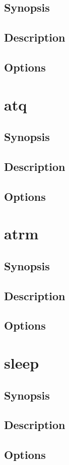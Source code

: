 \documentclass[a4paper, 10pt, onecolumn, openright, oneside]{book}
\begin{document}
			\subsection{Synopsis}
			\subsection{Description}
			\subsection{Options}
		\section{atq}
			\subsection{Synopsis}
			\subsection{Description}
			\subsection{Options}
		\section{atrm}
			\subsection{Synopsis}
			\subsection{Description}
			\subsection{Options}
		\section{sleep}
			\subsection{Synopsis}
			\subsection{Description}
			\subsection{Options}
\end{document}
